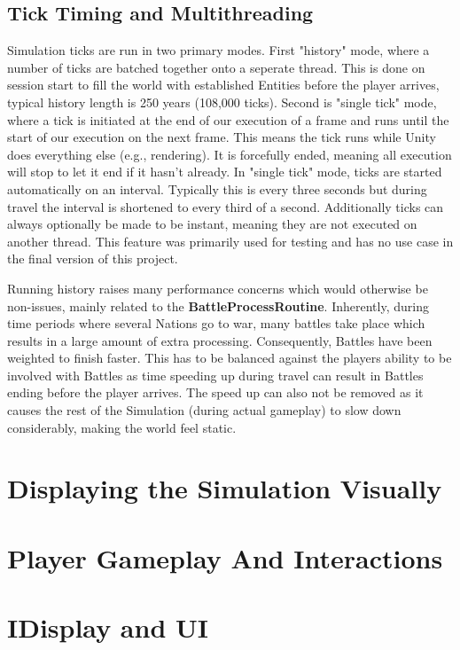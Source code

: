 \documentclass{report}
\begin{document}
\subsection{Tick Timing and Multithreading}

Simulation ticks are run in two primary modes. First "history" mode, where a number of ticks are batched together onto a seperate thread. This is done on session start to fill the world with established Entities before the player arrives, typical history length is 250 years (108,000 ticks). 
Second is "single tick" mode, where a tick is initiated at the end of our execution of a frame and runs until the start of our execution on the next frame. This means the tick runs while Unity does everything else (e.g., rendering). It is forcefully ended, meaning all execution will stop to let it end if it hasn't already. In "single tick" mode, ticks are started automatically on an interval. Typically this is every three seconds but during travel the interval is shortened to every third of a second.
Additionally ticks can always optionally be made to be instant, meaning they are not executed on another thread. This feature was primarily used for testing and has no use case in the final version of this project.

Running history raises many performance concerns which would otherwise be non-issues, mainly related to the \textbf{BattleProcessRoutine}. Inherently, during time periods where several Nations go to war, many battles take place which results in a large amount of extra processing. Consequently, Battles have been weighted to finish faster. This has to be balanced against the players ability to be involved with Battles as time speeding up during travel can result in Battles ending before the player arrives. The speed up can also not be removed as it causes the rest of the Simulation (during actual gameplay) to slow down considerably, making the world feel static.

\section{Displaying the Simulation Visually}

\section{Player Gameplay And Interactions}

\section{IDisplay and UI}
\end{document}
